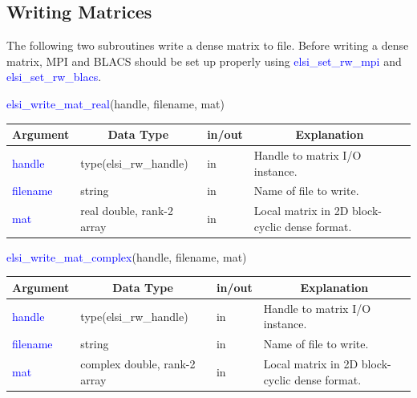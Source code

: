 \documentclass{report}
\begin{document}
\subsection{Writing Matrices}
\label{subsec:rw_write}
The following two subroutines write a dense matrix to file.  Before writing a dense matrix, MPI and BLACS should be set up properly using \textcolor{blue}{elsi\_set\_rw\_mpi} and \textcolor{blue}{elsi\_set\_rw\_blacs}.\\

\begin{labeling}{\hspace{6cm}}
\item [\hspace{0.3cm} \textcolor{blue}{elsi\_write\_mat\_real}(handle, filename, mat)]
\end{labeling}

\begin{tabular}[]{|p{20mm}|p{45mm}|p{15mm}|p{85mm}|}
\hline
\multicolumn{1}{|c|}{\textbf{Argument}} & \multicolumn{1}{c|}{\textbf{Data Type}} & \multicolumn{1}{c|}{\textbf{in/out}} & \multicolumn{1}{c|}{\textbf{Explanation}}\\
\hline
\textcolor{blue}{handle}   & type(elsi\_rw\_handle)    & in & Handle to matrix I/O instance.\\
\hline
\textcolor{blue}{filename} & string                    & in & Name of file to write.\\
\hline
\textcolor{blue}{mat}      & real double, rank-2 array & in & Local matrix in 2D block-cyclic dense format.\\
\hline
\end{tabular}

\bigskip
\begin{labeling}{\hspace{6cm}}
\item [\hspace{0.3cm} \textcolor{blue}{elsi\_write\_mat\_complex}(handle, filename, mat)]
\end{labeling}

\begin{tabular}[]{|p{20mm}|p{45mm}|p{15mm}|p{85mm}|}
\hline
\multicolumn{1}{|c|}{\textbf{Argument}} & \multicolumn{1}{c|}{\textbf{Data Type}} & \multicolumn{1}{c|}{\textbf{in/out}} & \multicolumn{1}{c|}{\textbf{Explanation}}\\
\hline
\textcolor{blue}{handle}   & type(elsi\_rw\_handle)       & in & Handle to matrix I/O instance.\\
\hline
\textcolor{blue}{filename} & string                       & in & Name of file to write.\\
\hline
\textcolor{blue}{mat}      & complex double, rank-2 array & in & Local matrix in 2D block-cyclic dense format.\\
\hline
\end{tabular}
\end{document}
